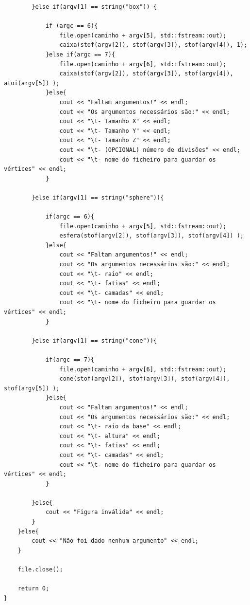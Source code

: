 \documentclass{report}
\begin{document}
\begin{lstlisting}
        }else if(argv[1] == string("box")) {

            if (argc == 6){
                file.open(caminho + argv[5], std::fstream::out);
                caixa(stof(argv[2]), stof(argv[3]), stof(argv[4]), 1);
            }else if(argc == 7){
                file.open(caminho + argv[6], std::fstream::out);
                caixa(stof(argv[2]), stof(argv[3]), stof(argv[4]), atoi(argv[5]) );
            }else{
                cout << "Faltam argumentos!" << endl;
                cout << "Os argumentos necessários são:" << endl;
                cout << "\t- Tamanho X" << endl;
                cout << "\t- Tamanho Y" << endl;
                cout << "\t- Tamanho Z" << endl;
                cout << "\t- (OPCIONAL) número de divisões" << endl;
                cout << "\t- nome do ficheiro para guardar os vértices" << endl;
            }

        }else if(argv[1] == string("sphere")){

            if(argc == 6){
                file.open(caminho + argv[5], std::fstream::out);
                esfera(stof(argv[2]), stof(argv[3]), stof(argv[4]) );
            }else{
                cout << "Faltam argumentos!" << endl;
                cout << "Os argumentos necessários são:" << endl;
                cout << "\t- raio" << endl;
                cout << "\t- fatias" << endl;
                cout << "\t- camadas" << endl;
                cout << "\t- nome do ficheiro para guardar os vértices" << endl;
            }

        }else if(argv[1] == string("cone")){

            if(argc == 7){
                file.open(caminho + argv[6], std::fstream::out);
                cone(stof(argv[2]), stof(argv[3]), stof(argv[4]), stof(argv[5]) );
            }else{
                cout << "Faltam argumentos!" << endl;
                cout << "Os argumentos necessários são:" << endl;
                cout << "\t- raio da base" << endl;
                cout << "\t- altura" << endl;
                cout << "\t- fatias" << endl;
                cout << "\t- camadas" << endl;
                cout << "\t- nome do ficheiro para guardar os vértices" << endl;
            }

        }else{
            cout << "Figura inválida" << endl;
        }
    }else{
        cout << "Não foi dado nenhum argumento" << endl;
    }

    file.close();

    return 0;
}

\end{lstlisting}
\clearpage
\end{document}
